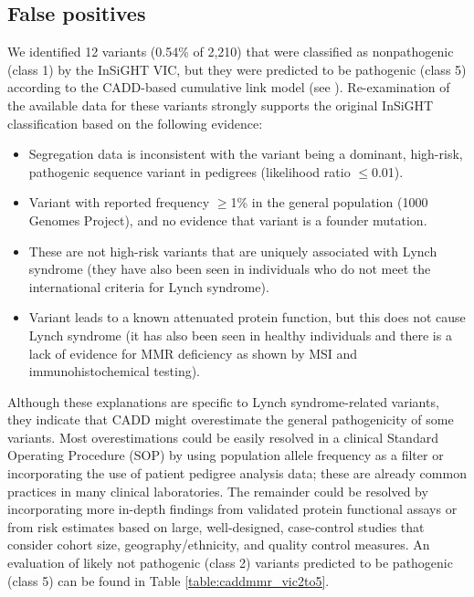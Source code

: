\linespread{1.05} %

\subsection{False positives}
We identified 12 variants (0.54\% of 2,210) that were classified as nonpathogenic (class 1) by the InSiGHT VIC, but they were predicted to be pathogenic (class 5) according to the CADD-based cumulative link model (see \textsl{}).
Re-examination of the available data for these variants strongly supports the original InSiGHT classification based on the following evidence:
\begin{itemize}
  \item Segregation data is inconsistent with the variant being a dominant, high-risk, pathogenic sequence variant in pedigrees (likelihood ratio $\leq$0.01).
  \item Variant with reported frequency $\geq$1\% in the general population (1000 Genomes Project), and no evidence that variant is a founder mutation.
  \item These are not high-risk variants that are uniquely associated with Lynch syndrome (they have also been seen in individuals who do not meet the international criteria for Lynch syndrome).
  \item Variant leads to a known attenuated protein function, but this does not cause Lynch syndrome (it has also been seen in healthy individuals and there is a lack of evidence for MMR deficiency as shown by MSI and immunohistochemical testing).
\end{itemize}
Although these explanations are specific to Lynch syndrome-related variants, they indicate that CADD might overestimate the general pathogenicity of some variants.
Most overestimations could be easily resolved in a clinical Standard Operating Procedure (SOP) by using population allele frequency as a filter or incorporating the use of patient pedigree analysis data; these are already common practices in many clinical laboratories.
The remainder could be resolved by incorporating more in-depth findings from validated protein functional assays or from risk estimates based on large, well-designed, case-control studies that consider cohort size, geography/ethnicity, and quality control measures\cite{Thompson_2013a}.
An evaluation of likely not pathogenic (class 2) variants predicted to be pathogenic (class 5) can be found in Table \ref{table:caddmmr_vic2to5}.

